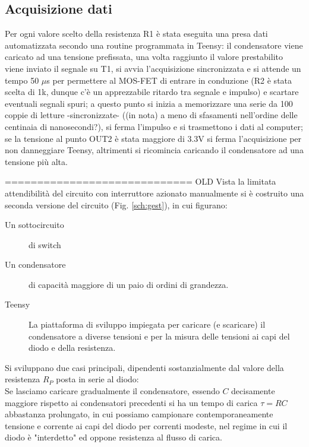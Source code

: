 \documentclass{article}[a4paper, oneside, 11pt]
\begin{document}
\subsection{Acquisizione dati}
Per ogni valore scelto della resistenza R1 è stata eseguita una presa dati automatizzata secondo una routine programmata in Teensy: il condensatore viene caricato ad una tensione prefissata, una volta raggiunto il valore prestabilito viene inviato il segnale su T1, si avvia l'acquisizione sincronizzata e si attende un tempo 50 $\mu$s per permettere al MOS-FET di entrare in conduzione (R2 è stata scelta di 1k, dunque c'è un apprezzabile ritardo tra segnale e impulso) e scartare eventuali segnali spuri; a questo punto si inizia a memorizzare una serie da 100 coppie di letture -sincronizzate- ((in nota) a meno di sfasamenti nell'ordine delle centinaia di nanosecondi?), si ferma l'impulso e si trasmettono i dati al computer; se la tensione al punto OUT2 è stata maggiore di 3.3V si ferma l'acquisizione per non danneggiare Teensy, altrimenti si ricomincia caricando il condensatore ad una tensione più alta.

============================= OLD\newline
Vista la limitata attendibilità del circuito con interruttore azionato
manualmente si è costruito una seconda versione del circuito (Fig.
\ref{sch:gest}), in cui figurano: 
\begin{description}
	\item [Un sottocircuito] di switch	
	\item [Un condensatore] di capacità maggiore di un paio di ordini di 
	grandezza.
	\item [Teensy] La piattaforma di sviluppo impiegata per caricare
	(e scaricare) il condensatore a diverse tensioni e per la misura delle
	tensioni ai capi del diodo e della resistenza.
\end{description}

Si sviluppano due casi principali, dipendenti sostanzialmente dal valore della
resistenza $R_P$ posta in serie al diodo:\\

Se lasciamo caricare gradualmente il condensatore, essendo $C$ decisamente
maggiore rispetto ai condensatori precedenti si ha un tempo di carica
$\tau = RC$ abbastanza prolungato, in cui possiamo campionare contemporaneamente
tensione e corrente ai capi del diodo per correnti modeste, nel regime in cui
il diodo è "interdetto" ed oppone resistenza al flusso di carica.
\end{document}
